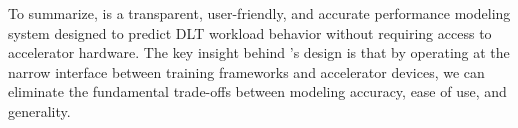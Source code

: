 To summarize, \sysname is a transparent, user-friendly, and accurate performance modeling system designed to predict DLT workload behavior without requiring access to accelerator hardware. The key insight behind \sysname's design is that by operating at the narrow interface between training frameworks and accelerator devices, we can eliminate the fundamental trade-offs between modeling accuracy, ease of use, and generality. 














































